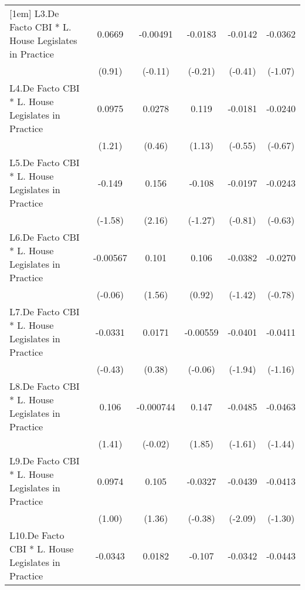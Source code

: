 {\begin{longtable}{l*{5}{c}}
[1em]
L3.De Facto CBI * L. House Legislates in Practice&   0.0669         & -0.00491         &  -0.0183         &  -0.0142         &  -0.0362         \\
                &   (0.91)         &  (-0.11)         &  (-0.21)         &  (-0.41)         &  (-1.07)         \\
[1em]
L4.De Facto CBI * L. House Legislates in Practice&   0.0975         &   0.0278         &    0.119         &  -0.0181         &  -0.0240         \\
                &   (1.21)         &   (0.46)         &   (1.13)         &  (-0.55)         &  (-0.67)         \\
[1em]
L5.De Facto CBI * L. House Legislates in Practice&   -0.149         &    0.156\sym{*}  &   -0.108         &  -0.0197         &  -0.0243         \\
                &  (-1.58)         &   (2.16)         &  (-1.27)         &  (-0.81)         &  (-0.63)         \\
[1em]
L6.De Facto CBI * L. House Legislates in Practice& -0.00567         &    0.101         &    0.106         &  -0.0382         &  -0.0270         \\
                &  (-0.06)         &   (1.56)         &   (0.92)         &  (-1.42)         &  (-0.78)         \\
[1em]
L7.De Facto CBI * L. House Legislates in Practice&  -0.0331         &   0.0171         & -0.00559         &  -0.0401         &  -0.0411         \\
                &  (-0.43)         &   (0.38)         &  (-0.06)         &  (-1.94)         &  (-1.16)         \\
[1em]
L8.De Facto CBI * L. House Legislates in Practice&    0.106         &-0.000744         &    0.147         &  -0.0485         &  -0.0463         \\
                &   (1.41)         &  (-0.02)         &   (1.85)         &  (-1.61)         &  (-1.44)         \\
[1em]
L9.De Facto CBI * L. House Legislates in Practice&   0.0974         &    0.105         &  -0.0327         &  -0.0439\sym{*}  &  -0.0413         \\
                &   (1.00)         &   (1.36)         &  (-0.38)         &  (-2.09)         &  (-1.30)         \\
[1em]
L10.De Facto CBI * L. House Legislates in Practice&  -0.0343         &   0.0182         &   -0.107         &  -0.0342         &  -0.0443         \\

\end{longtable}}
